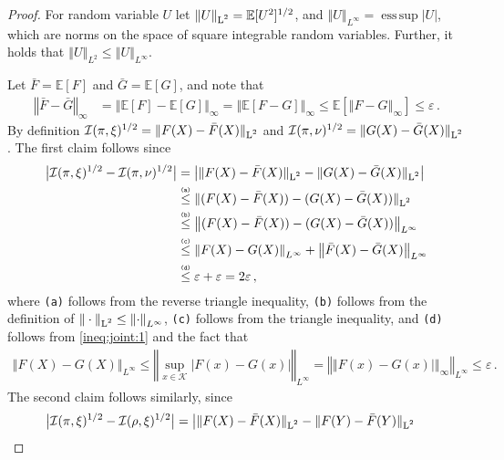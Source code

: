 \documentclass[letter, 12pt]{report}
\newcommand{\esssup}{\operatorname{ess\,sup}}
\newcommand{\explan}[1]{\stackrel{\text{\tiny \texttt{#1}}}}
\newcommand{\norm}[1]{\left \Vert  #1 \right \Vert}
\newcommand{\Lsnorm}[1]{ \Vert  #1 \Vert_{\text{\scriptsize \textrm{L}$^2$}}}
\newcommand{\E}{\mathbb E}
\newcommand{\cK}{\mathcal K}
\newcommand{\cI}{\mathcal I}
\newcommand{\1}{\mathbf{1}}
\renewcommand{\epsilon}{\varepsilon}
\theoremstyle{plain}
\theoremstyle{definition}
\theoremstyle{remark}
\begin{document}
\begin{proof}
    For random variable $U$ let $\Lsnorm{U} = \E[U^2]^{1/2}$, and $\norm{U}_{L^\infty}=\esssup |U|$, which are norms on the space of square integrable random variables.
    Further, it holds that $\norm{U}_{L^2} \leq \norm{U}_{L^\infty}$.

    Let $\bar F = \E[F]$ and $\bar G = \E[G]$, and note that
    \begin{align}
        \norm{\bar{F} - \bar{G}}_\infty
         & = \norm{\E[F] - \E[G]}_\infty
        = \norm{\E[F - G]}_\infty
        \leq \E[\norm{F - G}_\infty]
        \leq \epsilon \,.
        \label{ineq:joint:1}
    \end{align}
    By definition $\cI(\pi, \xi)^{1/2} = \Lsnorm{F(X) - \bar F(X)}$ and $\cI(\pi, \nu)^{1/2} = \Lsnorm{G(X) - \bar G(X)}$.
    The first claim follows since
    \begin{align*}
        \big|\cI(\pi, \xi)^{1/2} - \cI(\pi, \nu)^{1/2}\big|
         & =
        \big|
        \Lsnorm{F(X) - \bar F(X)} - \Lsnorm{G(X) - \bar G(X)}
        \big|
        \\
         &
        \explan{(a)}
        \leq
        \Lsnorm{(F(X) - \bar{F}(X)) - (G(X) - \bar{G}(X))}          \\
         &
        \explan{(b)}
        \leq
        \norm{(F(X) - \bar{F}(X)) - (G(X) - \bar{G}(X))}_{L^\infty} \\
         &
        \explan{(c)}
        \leq
        \norm{F(X) - G(X)}_{L^\infty} + \norm{\bar{F}(X) - \bar{G}(X)}_{L^\infty}
        \\
         &
        \explan{(d)}
        \leq
        \epsilon + \epsilon
        = 2\epsilon \,,
    \end{align*}
    where \texttt{(a)} follows from the reverse triangle inequality,
    \texttt{(b)} follows from the definition of $\Lsnorm{\cdot} \leq \norm{\cdot}_{L^\infty}$,
    \texttt{(c)} follows from the triangle inequality, and
    \texttt{(d)}
    follows from \cref{ineq:joint:1} and the fact that
    \begin{align*}
        \norm{F(X) - G(X)}_{L^\infty}
        \leq
        \norm{\sup_{x \in \cK} |F(x) - G(x)|}_{L^\infty}
        =
        \norm{\norm{F(x) - G(x)|}_\infty}_{L^\infty}\leq \epsilon\,.
    \end{align*}
    The second claim follows similarly, since
    \begin{align*}
        \big| \cI(\pi, \xi)^{1/2} - \cI(\rho, \xi)^{1/2}\big|
         & =
        \big|
        \Lsnorm{F(X) - \bar F(X)} - \Lsnorm{F(Y) - \bar F(Y)}

\end{align*}
\end{proof}
\end{document}
